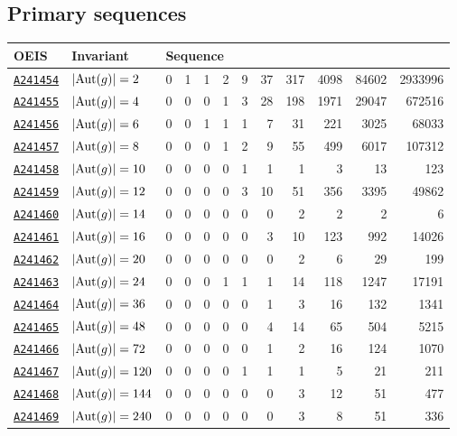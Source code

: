 \documentclass[12pt]{article}
\newcommand{\OEIS}[1]
{\href{https://oeis.org/#1}{\texttt{#1}}}
\begin{document}
\begin{appendices}
\subsection{Primary sequences}

\begin{longtable}{ l l r r r r r r r r r r}
\toprule
OEIS & Invariant & \multicolumn{10}{l}{Sequence} \\
\midrule\bottomrule
\OEIS{A241454} & $| \text{Aut}(g) | =2$ & 0 & 1 & 1 & 2 & 9 & 37 & 317 & 4098 & 84602 & 2933996 \\
\OEIS{A241455} & $| \text{Aut}(g) | =4$ & 0 & 0 & 0 & 1 & 3 & 28 & 198 & 1971 & 29047 & 672516 \\
\OEIS{A241456} & $| \text{Aut}(g) | =6$ & 0 & 0 & 1 & 1 & 1 & 7 & 31 & 221 & 3025 & 68033 \\
\OEIS{A241457} & $| \text{Aut}(g) | =8$ & 0 & 0 & 0 & 1 & 2 & 9 & 55 & 499 & 6017 & 107312 \\
\OEIS{A241458} & $| \text{Aut}(g) | =10$ & 0 & 0 & 0 & 0 & 1 & 1 & 1 & 3 & 13 & 123 \\
\OEIS{A241459} & $| \text{Aut}(g) | =12$ & 0 & 0 & 0 & 0 & 3 & 10 & 51 & 356 & 3395 & 49862 \\
\OEIS{A241460} & $| \text{Aut}(g) | =14$ & 0 & 0 & 0 & 0 & 0 & 0 & 2 & 2 & 2 & 6 \\
\OEIS{A241461} & $| \text{Aut}(g) | =16$ & 0 & 0 & 0 & 0 & 0 & 3 & 10 & 123 & 992 & 14026 \\
\OEIS{A241462} & $| \text{Aut}(g) | =20$ & 0 & 0 & 0 & 0 & 0 & 0 & 2 & 6 & 29 & 199 \\
\OEIS{A241463} & $| \text{Aut}(g) | =24$ & 0 & 0 & 0 & 1 & 1 & 1 & 14 & 118 & 1247 & 17191 \\
\OEIS{A241464} & $| \text{Aut}(g) | =36$ & 0 & 0 & 0 & 0 & 0 & 1 & 3 & 16 & 132 & 1341 \\
\OEIS{A241465} & $| \text{Aut}(g) | =48$ & 0 & 0 & 0 & 0 & 0 & 4 & 14 & 65 & 504 & 5215 \\
\OEIS{A241466} & $| \text{Aut}(g) | =72$ & 0 & 0 & 0 & 0 & 0 & 1 & 2 & 16 & 124 & 1070 \\
\OEIS{A241467} & $| \text{Aut}(g) | =120$ & 0 & 0 & 0 & 0 & 1 & 1 & 1 & 5 & 21 & 211 \\
\OEIS{A241468} & $| \text{Aut}(g) | =144$ & 0 & 0 & 0 & 0 & 0 & 0 & 3 & 12 & 51 & 477 \\
\OEIS{A241469} & $| \text{Aut}(g) | =240$ & 0 & 0 & 0 & 0 & 0 & 0 & 3 & 8 & 51 & 336 \\

\end{longtable}
\end{appendices}
\end{document}
